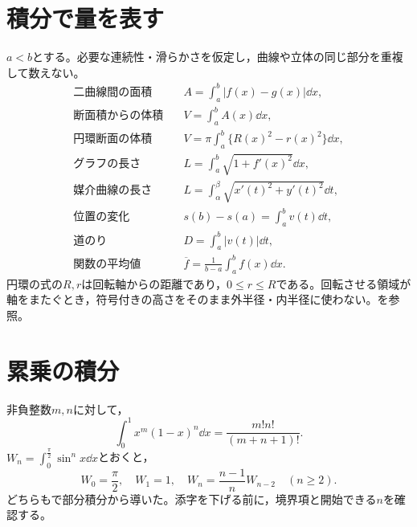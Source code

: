 \section{積分で量を表す}
$a<b$とする。必要な連続性・滑らかさを仮定し，曲線や立体の同じ部分を重複して数えない。
\begin{align*}
 \text{二曲線間の面積}\quad&A=\int_a^b|f(x)-g(x)|\dd x,\\
 \text{断面積からの体積}\quad&V=\int_a^b A(x)\dd x,\\
 \text{円環断面の体積}\quad&V=\pi\int_a^b\{R(x)^2-r(x)^2\}\dd x,\\
 \text{グラフの長さ}\quad&L=\int_a^b\sqrt{1+f'(x)^2}\dd x,\\
 \text{媒介曲線の長さ}\quad&L=\int_\alpha^\beta\sqrt{x'(t)^2+y'(t)^2}\dd t,\\
 \text{位置の変化}\quad&s(b)-s(a)=\int_a^b v(t)\dd t,\\
 \text{道のり}\quad&D=\int_a^b|v(t)|\dd t,\\
 \text{関数の平均値}\quad&\overline f=\frac1{b-a}\int_a^b f(x)\dd x.
\end{align*}
円環の式の$R,r$は回転軸からの距離であり，$0\le r\le R$である。回転させる領域が軸をまたぐとき，符号付きの高さをそのまま外半径・内半径に使わない。を参照。

\section{累乗の積分}
非負整数$m,n$に対して，
\[
 \int_0^1x^m(1-x)^n\dd x=\frac{m!n!}{(m+n+1)!}.
\]
$W_n=\int_0^{\frac\pi2}\sin^n x\dd x$とおくと，
\[
 W_0=\frac\pi2,\quad W_1=1,\quad
 W_n=\frac{n-1}{n}W_{n-2}\quad(n\ge2).
\]
どちらもで部分積分から導いた。添字を下げる前に，境界項と開始できる$n$を確認する。
